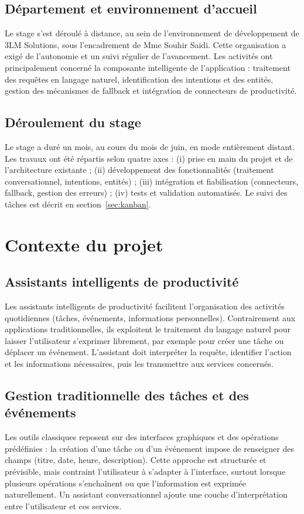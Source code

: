 \documentclass[11pt,a4paper,openany,oneside]{report}
\begin{document}
\subsection{Département et environnement d'accueil}
Le stage s'est déroulé à distance, au sein de l'environnement de développement de 3LM Solutions, sous l'encadrement de Mme Souhir Saidi. Cette organisation a exigé de l'autonomie et un suivi régulier de l'avancement. Les activités ont principalement concerné la composante intelligente de l'application : traitement des requêtes en langage naturel, identification des intentions et des entités, gestion des mécanismes de fallback et intégration de connecteurs de productivité.

\subsection{Déroulement du stage}
Le stage a duré un mois, au cours du mois de juin, en mode entièrement distant. Les travaux ont été répartis selon quatre axes : (i) prise en main du projet et de l'architecture existante ; (ii) développement des fonctionnalités (traitement conversationnel, intentions, entités) ; (iii) intégration et fiabilisation (connecteurs, fallback, gestion des erreurs) ; (iv) tests et validation automatisés. Le suivi des tâches est décrit en section~\ref{sec:kanban}.

\section{Contexte du projet}
\subsection{Assistants intelligents de productivité}
Les assistants intelligents de productivité facilitent l'organisation des activités quotidiennes (tâches, événements, informations personnelles). Contrairement aux applications traditionnelles, ils exploitent le traitement du langage naturel pour laisser l'utilisateur s'exprimer librement, par exemple pour créer une tâche ou déplacer un événement. L'assistant doit interpréter la requête, identifier l'action et les informations nécessaires, puis les transmettre aux services concernés.

\subsection{Gestion traditionnelle des tâches et des événements}
Les outils classiques reposent sur des interfaces graphiques et des opérations prédéfinies : la création d'une tâche ou d'un événement impose de renseigner des champs (titre, date, heure, description). Cette approche est structurée et prévisible, mais contraint l'utilisateur à s'adapter à l'interface, surtout lorsque plusieurs opérations s'enchaînent ou que l'information est exprimée naturellement. Un assistant conversationnel ajoute une couche d'interprétation entre l'utilisateur et ces services.
\end{document}
